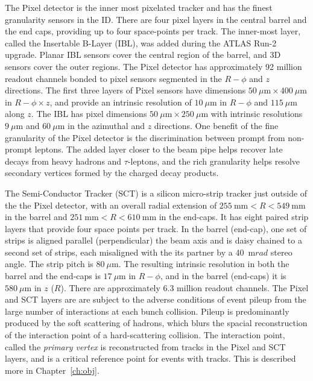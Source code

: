 The Pixel detector is the inner most pixelated tracker and has the finest granularity sensors in the ID.  There are four pixel layers in the central barrel and the end caps, providing up to four space-points per track.  The inner-most layer, called the Insertable B-Layer (IBL), was added during the ATLAS Run-2 upgrade.  Planar IBL sensors cover the central region of the barrel, and 3D sensors cover the outer regions.  The Pixel detector has approximately 92 million readout channels bonded to pixel sensors segmented in the $R-\phi$ and $z$ directions.  The first three layers of Pixel sensors have dimensions $50~\mu \mathrm{m} \times 400~\mu \mathrm{m}$ in $R-\phi \times z$, and provide an intrinsic resolution of $10~\mu \mathrm{m}$ in $R-\phi$ and $115~\mu \mathrm{m}$ along $z$.  The IBL has pixel dimensions $50~\mu \mathrm{m} \times 250~\mu \mathrm{m}$ with intrinsic resolutions $9~\mu \mathrm{m}$ and $60~\mu \mathrm{m}$ in the azimuthal and $z$ directions.  One benefit of the fine granularity of the Pixel detector is the discrimination between prompt from non-prompt leptons.  The added layer closer to the beam pipe helps recover late decays from heavy hadrons and $\tau$-leptons, and the rich granularity helps resolve secondary vertices formed by the charged decay products. 

The Semi-Conductor Tracker (SCT) is a silicon micro-strip tracker just outside of the the Pixel detector, with an overall radial extension of $255~\mathrm{mm} < R < 549~\mathrm{mm}$ in the barrel and $251~\mathrm{mm} < R < 610~\mathrm{mm}$ in the end-caps.  It has eight paired strip layers that provide four space points per track.  In the barrel (end-cap), one set of strips is aligned parallel (perpendicular) the beam axis and is daisy chained to a second set of strips, each misaligned with the its partner by a 40~$\mathrm{m}rad$ stereo angle.  The strip pitch is $80~\mu \mathrm{m}$.  The resulting intrinsic resolution in both the barrel and the end-caps is $17~\mu \mathrm{m}$ in  $R-\phi$, and in the barrel (end-caps) it is $580~\mu \mathrm{m}$ in $z$ ($R$).  There are approximately 6.3 million readout channels.  The Pixel and SCT layers are are subject to the adverse conditions of event pileup from the large number of interactions at each bunch collision.  Pileup is predominantly produced by the soft scattering of hadrons, which blurs the spacial reconstruction of the interaction point of a hard-scattering collision.  The interaction point, called the \textit{primary vertex} is reconstructed from tracks in the Pixel and SCT layers, and is a critical reference point for events with tracks.  This is described more in Chapter~\ref{ch:obj}.

